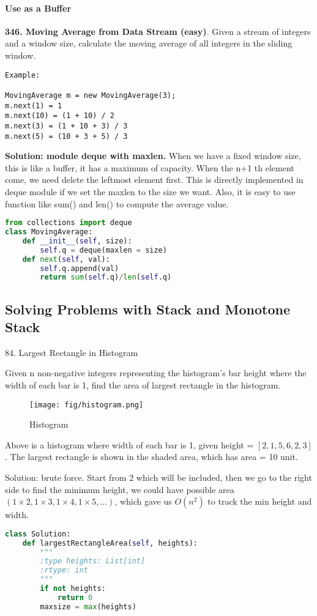 \documentclass[../main.tex]{subfiles}
\begin{document}
\paragraph{Use as a Buffer}
\begin{examples}[resume]
\item \textbf{346. Moving Average from Data Stream (easy)}. Given a stream of integers and a window size, calculate the moving average of all integers in the sliding window. 
\begin{lstlisting}[numbers = none]
Example:

MovingAverage m = new MovingAverage(3);
m.next(1) = 1
m.next(10) = (1 + 10) / 2
m.next(3) = (1 + 10 + 3) / 3
m.next(5) = (10 + 3 + 5) / 3
\end{lstlisting}

\textbf{Solution: module deque with maxlen.} When we have a fixed window size, this is like a buffer, it has a maximum of capacity. When the n+1 th element come, we need delete the leftmost element first. This is directly implemented in deque module if we set the maxlen to the size we want. Also, it is easy to use function like sum() and len() to compute the average value. 
\begin{lstlisting}[language=Python]
from collections import deque
class MovingAverage:
    def __init__(self, size):
        self.q = deque(maxlen = size)
    def next(self, val):
        self.q.append(val)
        return sum(self.q)/len(self.q)
\end{lstlisting}

\subsection{Solving Problems with Stack and Monotone Stack}
84. Largest Rectangle in Histogram

Given n non-negative integers representing the histogram’s bar height where the width of each bar is 1, find the area of largest rectangle in the histogram.
\begin{figure}
    \centering
    \texttt{[image: fig/histogram.png]}
    \caption{Histogram}
    \label{fig:histogram}
\end{figure}
Above is a histogram where width of each bar is 1, given height = $[2,1,5,6,2,3]$. The largest rectangle is shown in the shaded area, which has area = 10 unit.

Solution: brute force. Start from $2$ which will be included, then we go to the right side to find the minimum height, we could have possible area $(1\times 2, 1\times 3, 1\times 4, 1\times 5, ...)$, which gave us $O(n^2)$ to track the min height and width.
\begin{lstlisting}[language = Python]
class Solution:
    def largestRectangleArea(self, heights):
        """
        :type heights: List[int]
        :rtype: int
        """
        if not heights:
            return 0
        maxsize = max(heights)
        

\end{lstlisting}
\end{examples}
\end{document}
